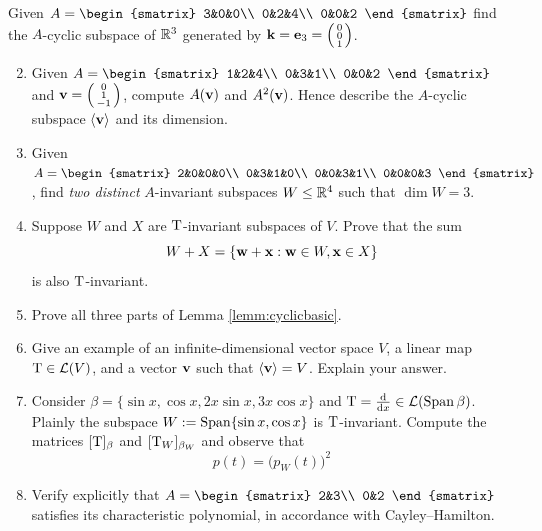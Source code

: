\begin{exercises}
	\exstart Given $A=
	\begin{smatrix}
	  3&0&0\\
	  0&2&4\\
	  0&0&2
  \end{smatrix}$ find the $A$-cyclic subspace of $\mathbb{R}^3$ generated by ${\mathbf{k}}={\mathbf{e}}_3=\left(\begin{smallmatrix}0\\0\\1\end{smallmatrix}\right)$.
  
	\begin{enumerate}\setcounter{enumi}{1}
	  \item Given $A=
	  \begin{smatrix}
	  	1&2&4\\
	  	0&3&1\\
	  	0&0&2
	  \end{smatrix}$ and ${\mathbf{v}}=\left(\begin{smallmatrix}0\\1\\-1\end{smallmatrix}\right)$, compute $A({\mathbf{v}})$ and $A^2({\mathbf{v}})$. Hence describe the $A$-cyclic subspace $\left\langle {\mathbf{v}}\right\rangle$ and its dimension.
	  
	  
		\item Given $A=
		\begin{smatrix}
	  	2&0&0&0\\
	  	0&3&1&0\\
	  	0&0&3&1\\
	  	0&0&0&3
	  \end{smatrix}$, 
	  find \emph{two distinct} $A$-invariant subspaces $W\le\mathbb{R}^4$ such that $\dim W=3$.
	
	
	  \item Suppose $W$ and $X$ are $\mathrm{T}$-invariant subspaces of $V$. Prove that the sum
	  \[
	  	W+X=\{{\mathbf{w}}+{\mathbf{x}}:{\mathbf{w}}\in W,{\mathbf{x}}\in X\}
	  \]
	  is also $\mathrm{T}$-invariant. 
		
		
		\item Prove all three parts of Lemma \ref{lemm:cyclicbasic}.
	
	
		\item Give an example of an infinite-dimensional vector space $V$, a linear map $\mathrm{T}\in\mathcal{L}(V)$, and a vector ${\mathbf{v}}$ such that $\left\langle {\mathbf{v}}\right\rangle=V$. Explain your answer.
		
		
		\item Consider $\beta=\{\sin x,\cos x,2x\sin x,3x\cos x\}$ and $\mathrm{T}=\frac{\mathrm{d} }{\mathrm{d} x}\in\mathcal{L}(\operatorname{Span}\beta)$. Plainly the subspace $W:=\operatorname{Span}\{\sin x,\cos x\}$ is $\mathrm{T}$-invariant. Compute the matrices $[\mathrm{T}]_\beta$ and $[\mathrm{T}_W]_{\beta_W}$ and observe that
		\[
			p(t)=\bigl(p_W(t)\bigr)^2
		\]
	
		
		\item Verify explicitly that $A=
		\begin{smatrix}
			2&3\\
			0&2
		\end{smatrix}$
		satisfies its characteristic polynomial, in accordance with Cayley--Hamilton.
	  	

\end{enumerate}
\end{exercises}
